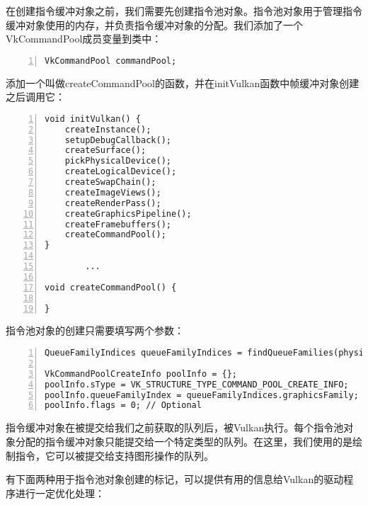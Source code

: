 \documentclass{ctexart}
\begin{document}
在创建指令缓冲对象之前，我们需要先创建指令池对象。指令池对象用于管理指令缓冲对象使用的内存，并负责指令缓冲对象的分配。我们添加了一个VkCommandPool成员变量到类中：

\begin{lstlisting}[language={[ANSI]C},keywordstyle=\color{blue!70},commentstyle=\color{red!50!green!50!blue!50},frame=shadowbox, rulesepcolor=\color{red!20!green!20!blue!20},basicstyle=\small,numbers=left, numberstyle=\tiny,breaklines=true]
VkCommandPool commandPool;
\end{lstlisting}

添加一个叫做createCommandPool的函数，并在initVulkan函数中帧缓冲对象创建之后调用它：

\begin{lstlisting}[language={[ANSI]C},keywordstyle=\color{blue!70},commentstyle=\color{red!50!green!50!blue!50},frame=shadowbox, rulesepcolor=\color{red!20!green!20!blue!20},basicstyle=\small,numbers=left, numberstyle=\tiny,breaklines=true]
void initVulkan() {
	createInstance();
	setupDebugCallback();
	createSurface();
	pickPhysicalDevice();
	createLogicalDevice();
	createSwapChain();
	createImageViews();
	createRenderPass();
	createGraphicsPipeline();
	createFramebuffers();
	createCommandPool();
}

		...

void createCommandPool() {

}
\end{lstlisting}

指令池对象的创建只需要填写两个参数：

\begin{lstlisting}[language={[ANSI]C},keywordstyle=\color{blue!70},commentstyle=\color{red!50!green!50!blue!50},frame=shadowbox, rulesepcolor=\color{red!20!green!20!blue!20},basicstyle=\small,numbers=left, numberstyle=\tiny,breaklines=true]
QueueFamilyIndices queueFamilyIndices = findQueueFamilies(physicalDevice);

VkCommandPoolCreateInfo poolInfo = {};
poolInfo.sType = VK_STRUCTURE_TYPE_COMMAND_POOL_CREATE_INFO;
poolInfo.queueFamilyIndex = queueFamilyIndices.graphicsFamily;
poolInfo.flags = 0; // Optional
\end{lstlisting}

指令缓冲对象在被提交给我们之前获取的队列后，被Vulkan执行。每个指令池对象分配的指令缓冲对象只能提交给一个特定类型的队列。在这里，我们使用的是绘制指令，它可以被提交给支持图形操作的队列。

有下面两种用于指令池对象创建的标记，可以提供有用的信息给Vulkan的驱动程序进行一定优化处理：
\end{document}
